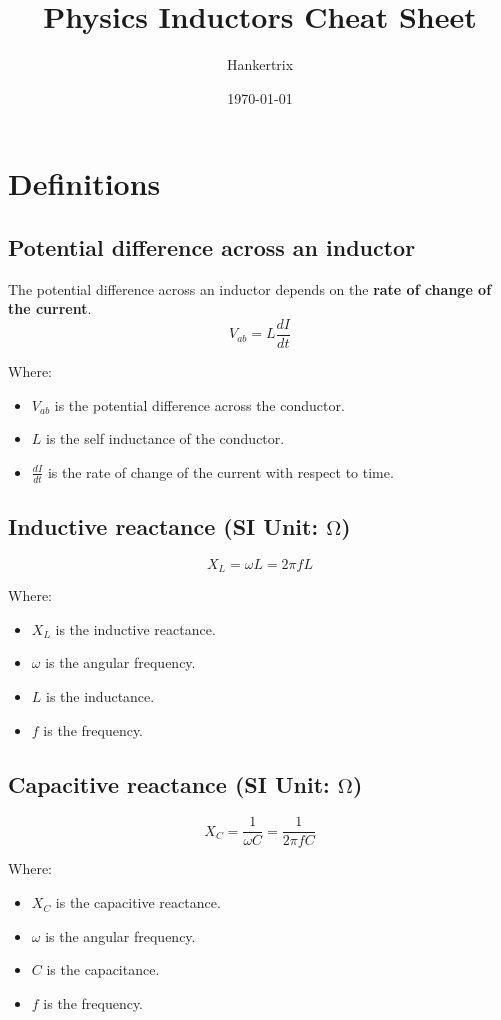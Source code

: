 \documentclass[11pt]{article}
\author{Hankertrix}
\date{\today}
\title{Physics Inductors Cheat Sheet}
\begin{document}
\maketitle
\setcounter{tocdepth}{2}
\tableofcontents \clearpage
\section{Definitions}
\label{sec:org4b5990b}

\subsection{Potential difference across an inductor}
\label{sec:org4df372e}
The potential difference across an inductor depends on the \textbf{rate of change of the current}.
\[V_{ab} = L \frac{dI}{dt}\]

Where:
\begin{itemize}
\item \(V_{ab}\) is the potential difference across the conductor.
\item \(L\) is the self inductance of the conductor.
\item \(\frac{dI}{dt}\) is the rate of change of the current with respect to time.
\end{itemize}

\subsection{Inductive reactance (SI Unit: \(\unit{\ohm}\))}
\label{sec:org438c068}
\[X_L = \omega L = 2 \pi f L\]

Where:
\begin{itemize}
\item \(X_L\) is the inductive reactance.
\item \(\omega\) is the angular frequency.
\item \(L\) is the inductance.
\item \(f\) is the frequency.
\end{itemize}

\subsection{Capacitive reactance (SI Unit: \(\unit{\ohm}\))}
\label{sec:org35f6663}
\[X_C = \frac{1}{\omega C} = \frac{1}{2 \pi f C}\]

Where:
\begin{itemize}
\item \(X_C\) is the capacitive reactance.
\item \(\omega\) is the angular frequency.
\item \(C\) is the capacitance.
\item \(f\) is the frequency.
\end{itemize}
\end{document}
